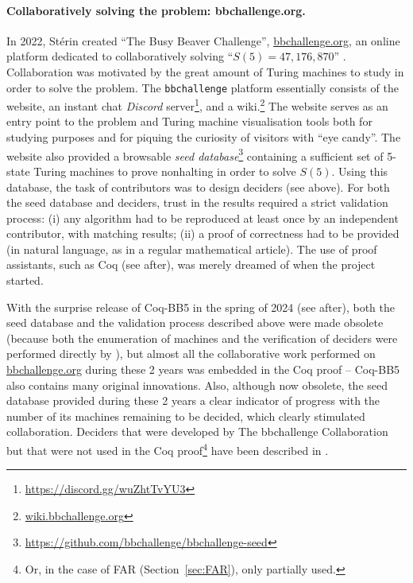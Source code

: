 \documentclass[a4paper,british]{article}
\theoremstyle{definition} %
\numberwithin{equation}{section}
\theoremstyle{definition} %
\newcommand{\BBtheFifth}{47{,}176{,}870}
\newcommand{\CoqBB}{Coq-BB5\xspace}
\begin{document}
\newpage
\paragraph{Collaboratively solving the problem: bbchallenge.org.} In 2022, Stérin created ``The Busy Beaver Challenge'', \url{bbchallenge.org}, an online platform dedicated to collaboratively solving ``$S(5)=\BBtheFifth$'' \cite{sterin_2022_14955828}. Collaboration was motivated by the great amount of Turing machines to study in order to solve the problem. The \texttt{bbchallenge} platform essentially consists of the website, an instant chat \textit{Discord} server\footnote{\url{https://discord.gg/wuZhtTvYU3}}, and a wiki.\footnote{\url{wiki.bbchallenge.org}} The website serves as an entry point to the problem and Turing machine visualisation tools both for studying purposes and for piquing the curiosity of visitors with ``eye candy''. The website also provided a browsable \textit{seed database}\footnote{\url{https://github.com/bbchallenge/bbchallenge-seed}} containing a sufficient set of 5-state Turing machines to prove nonhalting in order to solve $S(5)$. Using this database, the task of contributors was to design deciders (see above). For both the seed database and deciders, trust in the results required a strict validation process: (i) any algorithm had to be reproduced at least once by an independent contributor, with matching results; (ii) a proof of correctness had to be provided (in natural language, as in a regular mathematical article). The use of proof assistants, such as Coq (see after), was merely dreamed of when the project started.


With the surprise release of \CoqBB in the spring of 2024 (see after), both the seed database and the validation process described above were made obsolete (because both the enumeration of machines and the verification of deciders were performed directly by \Coq), but almost all the collaborative work performed on \url{bbchallenge.org} during these 2 years was embedded in the Coq proof -- \CoqBB also contains many original innovations. Also, although now obsolete, the seed database provided during these 2 years a clear indicator of progress with the number of its machines remaining to be decided, which clearly stimulated collaboration. Deciders that were developed by The bbchallenge Collaboration but that were not used in the Coq proof\footnote{Or, in the case of FAR (Section~\ref{sec:FAR}), only partially used.} have been described in \cite{bbchallenge_part1}.
\end{document}
